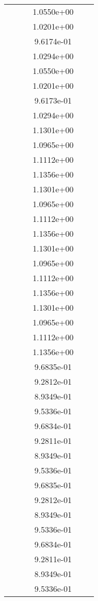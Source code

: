 \begin{xltabular}{\textwidth}{r|rS[table-format=1.3e+2]S[table-format=1.4e+2]S[table-format=1.4e+2]S[table-format=-1.5]}
&  &  & 1.0550e+00 & & \\
&  &  & 1.0201e+00 & & \\
&  &  & 9.6174e-01 & & \\
&  &  & 1.0294e+00 & & \\
&  &  & 1.0550e+00 & & \\
&  &  & 1.0201e+00 & & \\
&  &  & 9.6173e-01 & & \\
&  &  & 1.0294e+00 & & \\
&  &  & 1.1301e+00 & & \\
&  &  & 1.0965e+00 & & \\
&  &  & 1.1112e+00 & & \\
&  &  & 1.1356e+00 & & \\
&  &  & 1.1301e+00 & & \\
&  &  & 1.0965e+00 & & \\
&  &  & 1.1112e+00 & & \\
&  &  & 1.1356e+00 & & \\
&  &  & 1.1301e+00 & & \\
&  &  & 1.0965e+00 & & \\
&  &  & 1.1112e+00 & & \\
&  &  & 1.1356e+00 & & \\
&  &  & 1.1301e+00 & & \\
&  &  & 1.0965e+00 & & \\
&  &  & 1.1112e+00 & & \\
&  &  & 1.1356e+00 & & \\
&  &  & 9.6835e-01 & & \\
&  &  & 9.2812e-01 & & \\
&  &  & 8.9349e-01 & & \\
&  &  & 9.5336e-01 & & \\
&  &  & 9.6834e-01 & & \\
&  &  & 9.2811e-01 & & \\
&  &  & 8.9349e-01 & & \\
&  &  & 9.5336e-01 & & \\
&  &  & 9.6835e-01 & & \\
&  &  & 9.2812e-01 & & \\
&  &  & 8.9349e-01 & & \\
&  &  & 9.5336e-01 & & \\
&  &  & 9.6834e-01 & & \\
&  &  & 9.2811e-01 & & \\
&  &  & 8.9349e-01 & & \\
&  &  & 9.5336e-01 & & \\

\end{xltabular}
